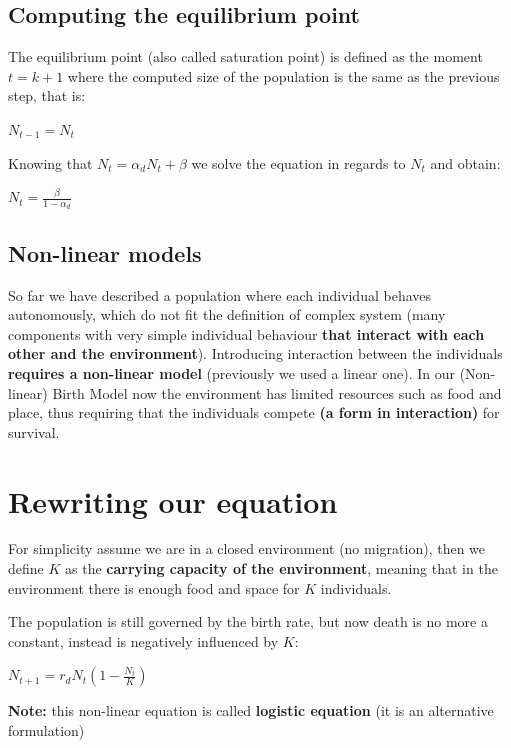 \subsection{Computing the equilibrium point}
The equilibrium point (also called saturation point) is defined as the moment $t=k+1$ where the computed size of the population is the same as the previous step, that is:

\begin{center}
    $N_{t-1} = N_{t}$
\end{center}

Knowing that $N_{t} = \alpha_{d}N_{t} + \beta$ we solve the equation in regards to $N_{t}$ and obtain:

\begin{center}
    $N_{t} = \frac{\beta}{1 - \alpha_{d}}$
\end{center}

\subsection{Non-linear models}
So far we have described a population where each individual behaves autonomously, which do not fit the definition of complex system (many components with very simple individual behaviour \textbf{that interact with each other and the environment}). Introducing interaction between the individuals \textbf{requires a non-linear model} (previously we used a linear one). In our (Non-linear) Birth Model now the environment has limited resources such as food and place, thus requiring that the individuals compete \textbf{(a form in interaction)} for survival.

\section{Rewriting our equation}
For simplicity assume we are in a closed environment (no migration), then we define $K$ as the \textbf{carrying capacity of the environment}, meaning that in the environment there is enough food and space for $K$ individuals.
\par The population is still governed by the birth rate, but now death is no more a constant, instead is negatively influenced by $K$:

\begin{center}
    $N_{t+1} = r_{d}N_{t}(1 - \frac{N_{t}}{K})$
\end{center}
\textbf{Note:} this non-linear equation is called \textbf{logistic equation} (it is an alternative formulation)

